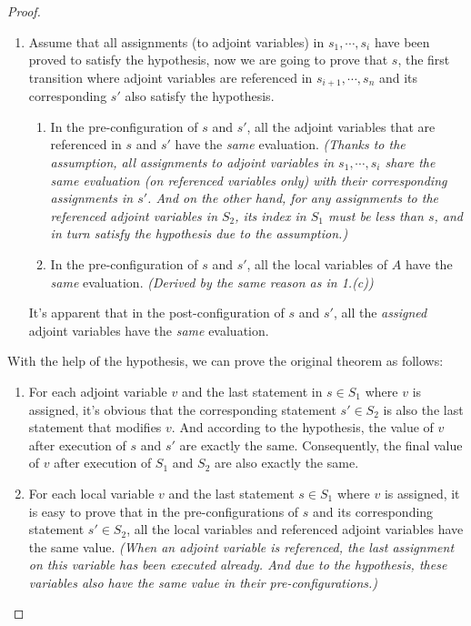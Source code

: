 \begin{proof}
\begin{enumerate}
        \item Assume that all assignments (to adjoint variables) in $s_1,\cdots,s_i$ have been proved to satisfy the hypothesis, now we are going to prove that $s$, the first transition where adjoint variables are referenced in $s_{i+1},\cdots,s_n$ and its corresponding $s'$ also satisfy the hypothesis.

        \begin{enumerate}
            \item In the pre-configuration of $s$ and $s'$, all the adjoint variables that are referenced in $s$ and $s'$ have the \emph{same} evaluation. \emph{(Thanks to the assumption, all assignments to adjoint variables in $s_1,\cdots,s_i$ share the same evaluation (on referenced variables only) with their corresponding assignments in $s'$. And on the other hand, for any assignments to the referenced adjoint variables in $S_2$, its index in $S_1$ must be less than $s$, and in turn satisfy the hypothesis due to the assumption.)}
            \item In the pre-configuration of $s$ and $s'$, all the local variables of $A$ have the \emph{same} evaluation. \emph{(Derived by the same reason as in 1.(c))}
        \end{enumerate}

        It's apparent that in the post-configuration of $s$ and $s'$, all the \emph{assigned} adjoint variables have the \emph{same} evaluation.
    \end{enumerate}

    With the help of the hypothesis, we can prove the original theorem as follows:
    \begin{enumerate}
        \item For each adjoint variable $v$ and the last statement in $s\in S_1$ where $v$ is assigned, it's obvious that the corresponding statement $s'\in S_2$ is also the last statement that modifies $v$. And according to the hypothesis, the value of $v$ after execution of $s$ and $s'$ are exactly the same. Consequently, the final value of $v$ after execution of $S_1$ and $S_2$ are also exactly the same.
        \item For each local variable $v$ and the last statement $s\in S_1$ where $v$ is assigned, it is easy to prove that in the pre-configurations of $s$ and its corresponding statement $s'\in S_2$, all the local variables and referenced adjoint variables have the same value. \emph{(When an adjoint variable is referenced, the last assignment on this variable has been executed already. And due to the hypothesis, these variables also have the same value in their pre-configurations.)}
    \end{enumerate}
\end{proof}